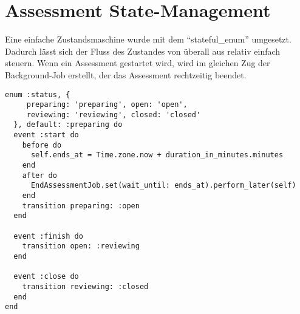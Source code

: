 \section{Assessment State-Management}

Eine einfache Zustandsmaschine wurde mit dem \enquote{stateful\_enum} umgesetzt. Dadurch lässt sich
der Fluss des Zustandes von überall aus relativ einfach steuern. Wenn ein Assessment gestartet wird, wird
im gleichen Zug der Background-Job erstellt, der das Assessment rechtzeitig beendet.

\begin{codebox}
\begin{verbatim}
enum :status, { 
     preparing: 'preparing', open: 'open',
     reviewing: 'reviewing', closed: 'closed' 
  }, default: :preparing do
  event :start do
    before do
      self.ends_at = Time.zone.now + duration_in_minutes.minutes
    end
    after do
      EndAssessmentJob.set(wait_until: ends_at).perform_later(self)
    end
    transition preparing: :open
  end

  event :finish do
    transition open: :reviewing
  end

  event :close do
    transition reviewing: :closed
  end
end
\end{verbatim}
\end{codebox}
